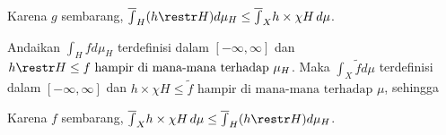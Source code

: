 {

\noindent Karena $g$ sembarang,
$\overline{\int}_H(h\restr H)d\mu_H
\le\overline{\int}_Xh\times\chi H\,d\mu$.

\medskip

 Andaikan $\int_Hfd\mu_H$ terdefinisi dalam
$[-\infty,\infty]$ dan
$h\restr H\le f\,\,\text{hampir di mana-mana terhadap }\mu_H$. Maka
$\int_X\tilde fd\mu$ terdefinisi dalam $[-\infty,\infty]$ dan
$h\times\chi H\le\tilde f\,\,\text{hampir di mana-mana terhadap }\mu$, sehingga


\noindent Karena $f$ sembarang,
$\overline{\int}_Xh\times\chi H\,d\mu
\le\overline{\int}_H(h\restr H)d\mu_H$.
}%

